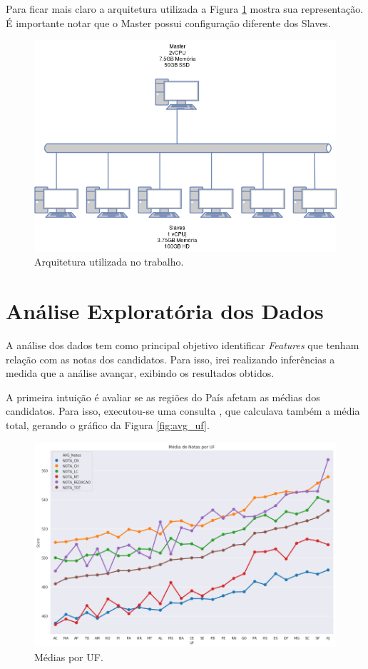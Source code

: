 \documentclass{article}
\begin{document}
Para ficar mais claro a arquitetura utilizada a Figura \ref{fig:arch} mostra sua representação. É importante notar que o Master possui configuração diferente dos Slaves.

\begin{figure}[H]
\centering
  \includegraphics[width=0.8 \linewidth]{img/arch.png}
  \caption{Arquitetura utilizada no trabalho.}
  \label{fig:arch}
\end{figure}

\newpage
\section{Análise Exploratória dos Dados}
\label{sect:expl_anal}

A análise dos dados tem como principal objetivo identificar \emph{Features} que tenham relação com as notas dos candidatos. Para isso, irei realizando inferências a medida que a análise avançar, exibindo os resultados obtidos.

A primeira intuição é avaliar se as regiões do País afetam as médias dos candidatos. Para isso, executou-se uma consulta , que calculava também a média total, gerando o gráfico da Figura \ref{fig:avg_uf}.

\begin{figure}[H]
\centering
  \includegraphics[width= 0.8 \linewidth]{img/mean_by_uf.png}
  \caption{Médias por UF.}
  \label{fig:fig_maq_criad}
\end{figure}
\end{document}
